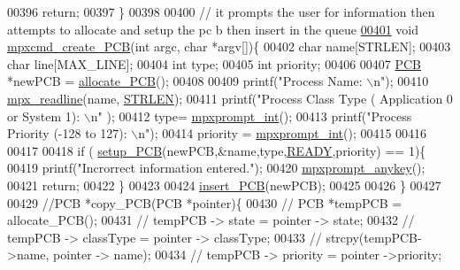\begin{DoxyCode}
{00396         \textcolor{keywordflow}{return};
00397         \}
00398 
00400 \textcolor{comment}{// it prompts the user for information then attempts to allocate and setup the pc
      b then insert in the queue}
\hypertarget{mpx__r2_8c_source_l00401}{}\hyperlink{mpx__r2_8h_a782285c58822e411fb75be1e65fe1104}{00401} \textcolor{keywordtype}{void} \hyperlink{mpx__r2_8c_a782285c58822e411fb75be1e65fe1104}{mpxcmd_create_PCB}(\textcolor{keywordtype}{int} argc, \textcolor{keywordtype}{char} *argv[])\{
00402         \textcolor{keywordtype}{char} name[STRLEN];
00403         \textcolor{keywordtype}{char} line[MAX\_LINE];
00404         \textcolor{keywordtype}{int} type;
00405         \textcolor{keywordtype}{int} priority;
00406 
00407         \hyperlink{structprocess}{PCB} *newPCB = \hyperlink{mpx__r2_8c_a58a8a1ea0a96b9ecf0be29179a5a0a1e}{allocate_PCB}();
00408         
00409         printf(\textcolor{stringliteral}{"Process Name: \(\backslash\)n"});
00410         \hyperlink{mpx__util_8c_a781169ab05ad54c0d37253d73060b77f}{mpx_readline}(name, \hyperlink{mpx__r2_8h_a278cf415676752815cfb411cb0b32802}{STRLEN});
00411         printf(\textcolor{stringliteral}{"Process Class Type ( Application 0 or System  1): \(\backslash\)n"} );
00412         type= \hyperlink{mpx__util_8c_aacc3dfe470919b0bd1133bce90383e18}{mpxprompt_int}();
00413         printf(\textcolor{stringliteral}{"Process Priority (-128 to 127): \(\backslash\)n"});
00414         priority = \hyperlink{mpx__util_8c_aacc3dfe470919b0bd1133bce90383e18}{mpxprompt_int}();
00415         
00416         
00417         
00418         \textcolor{keywordflow}{if} ( \hyperlink{mpx__r2_8c_a316c9619aba53c03c17afbc0a0dbf096}{setup_PCB}(newPCB,&name,type,\hyperlink{mpx__r2_8h_ad1235d5ce36f7267285e82dccd428aa6}{READY},priority) == 1)\{
00419                 printf(\textcolor{stringliteral}{"Incrorrect information entered."});
00420                 \hyperlink{mpx__util_8c_a338d01dfe3c80732c00450203c85b964}{mpxprompt_anykey}();
00421                 \textcolor{keywordflow}{return};
00422         \}       
00423         
00424         \hyperlink{mpx__r2_8c_aa3b334e3a5afd6e590917667ad359a6f}{insert_PCB}(newPCB);
00425         
00426 \}
00427 
00429 \textcolor{comment}{//PCB *copy\_PCB(PCB *pointer)\{}
00430 \textcolor{comment}{//              PCB *tempPCB = allocate\_PCB();}
00431 \textcolor{comment}{//              tempPCB -> state = pointer -> state;}
00432 \textcolor{comment}{//              tempPCB -> classType = pointer -> classType;}
00433 \textcolor{comment}{//              strcpy(tempPCB->name, pointer -> name);}
00434 \textcolor{comment}{//              tempPCB -> priority = pointer ->priority;}
}
\end{DoxyCode}
